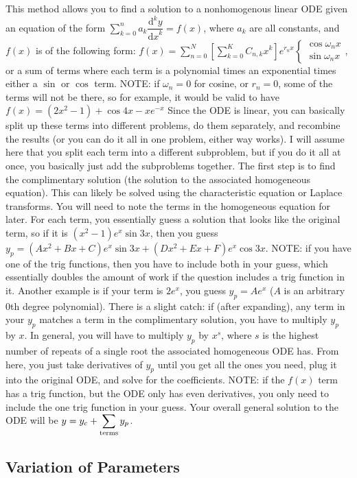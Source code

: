 \documentclass[12pt]{article}
\newcommand \dstyle \displaystyle
\renewcommand \d [1] {\mathrm{d}{#1}}
\newcommand \dx {{\d x}}
\newcommand \ndydx [1] {\dfrac{\mathrm{d}^{#1} y}{\dx^{#1}}}
\begin{document}
This method allows you to find a solution to a nonhomogenous linear ODE given an equation of the form $\dstyle \sum_{k=0}^n a_k \ndydx k = f(x)$, where $a_k$ are all constants, and $f(x)$ is of the following form:
$\dstyle f(x) = \sum_{n=0}^N \left[\sum_{k=0}^K C_{n,k} x^k\right] e^{r_n x} \begin{cases}
	\cos \omega_n x \\
	\sin \omega_n x
\end{cases}$, or a sum of terms where each term is a polynomial times an exponential times either a $\sin$ or $\cos$ term. NOTE: if $\omega_n = 0$ for cosine, or $r_n = 0$, some of the terms will not be there, so for example, it would be valid to have $f(x) = (2x^2 - 1) + \cos 4x - x e^{-x}$ Since the ODE is linear, you can basically split up these terms into different problems, do them separately, and recombine the results (or you can do it all in one problem, either way works). I will assume here that you split each term into a different subproblem, but if you do it all at once, you basically just add the subproblems together. The first step is to find the complimentary solution (the solution to the associated homogeneous equation). This can likely be solved using the characteristic equation or Laplace transforms. You will need to note the terms in the homogeneous equation for later. For each term, you essentially guess a solution that looks like the original term, so if it is $(x^2 - 1) e^x \sin 3x$, then you guess $y_p = (Ax^2 + Bx + C) e^x \sin 3x + (Dx^2 + Ex + F) e^x \cos 3x$. NOTE: if you have one of the trig functions, then you have to include both in your guess, which essentially doubles the amount of work if the question includes a trig function in it. Another example is if your term is $2 e^x$, you guess $y_p = A e^x$ ($A$ is an arbitrary 0th degree polynomial). There is a slight catch: if (after expanding), any term in your $y_p$ matches a term in the complimentary solution, you have to multiply $y_p$ by $x$. In general, you will have to multiply $y_p$ by $x^s$, where $s$ is the highest number of repeats of a single root the associated homogeneous ODE has. From here, you just take derivatives of $y_p$ until you get all the ones you need, plug it into the original ODE, and solve for the coefficients. NOTE: if the $f(x)$ term has a trig function, but the ODE only has even derivatives, you only need to include the one trig function in your guess. Your overall general solution to the ODE will be $\dstyle y = y_c + \sum_{\rm terms} y_p$.

\subsection{Variation of Parameters}
\end{document}
